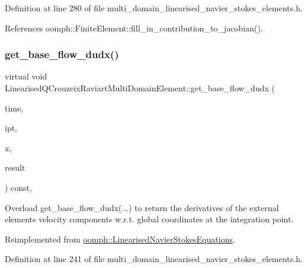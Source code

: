 Definition at line 280 of file multi\+\_\+domain\+\_\+linearised\+\_\+navier\+\_\+stokes\+\_\+elements.\+h.



References oomph\+::\+Finite\+Element\+::fill\+\_\+in\+\_\+contribution\+\_\+to\+\_\+jacobian().

\mbox{\label{classLinearisedQCrouzeixRaviartMultiDomainElement_a3be73b81d6e0cb9b9fba706620966a82}} 
\subsubsection{\texorpdfstring{get\+\_\+base\+\_\+flow\+\_\+dudx()}{get\_base\_flow\_dudx()}}
{\footnotesize\ttfamily virtual void Linearised\+Q\+Crouzeix\+Raviart\+Multi\+Domain\+Element\+::get\+\_\+base\+\_\+flow\+\_\+dudx (\begin{DoxyParamCaption}\item[{const double \&}]{time,  }\item[{const unsigned \&}]{ipt,  }\item[{const \hyperlink{classoomph_1_1Vector}{Vector}$<$ double $>$ \&}]{x,  }\item[{\hyperlink{classoomph_1_1DenseMatrix}{Dense\+Matrix}$<$ double $>$ \&}]{result }\end{DoxyParamCaption}) const\hspace{0.3cm}{\ttfamily [inline]}, {\ttfamily [virtual]}}



Overload get\+\_\+base\+\_\+flow\+\_\+dudx(...) to return the derivatives of the external element\textquotesingle{}s velocity components w.\+r.\+t. global coordinates at the integration point. 



Reimplemented from \hyperlink{classoomph_1_1LinearisedNavierStokesEquations_ab4b45c111571d3904985dcefcae8ef67}{oomph\+::\+Linearised\+Navier\+Stokes\+Equations}.



Definition at line 241 of file multi\+\_\+domain\+\_\+linearised\+\_\+navier\+\_\+stokes\+\_\+elements.\+h.



